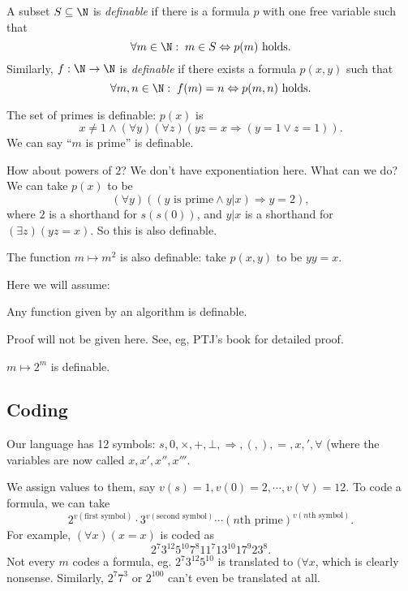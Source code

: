 \documentclass[a4paper]{article}
\begin{document}
\begin{defi}[Definability]
  A subset $S\subseteq \N$ is \emph{definable} if there is a formula $p$ with one free variable such that
  \[
    \forall m\in \N:\; m\in S \Leftrightarrow p(m)\text{ holds}.
  \]
  Similarly, $f: \N \to \N$ is \emph{definable} if there exists a formula $p(x, y)$ such that
  \[
    \forall m, n\in \N:\; f(m) = n \Leftrightarrow p(m, n)\text{ holds}.
  \]
\end{defi}

\begin{eg}
  The set of primes is definable: $p(x)$ is
  \[
    x\not = 1 \wedge (\forall y)(\forall z)(yz = x \Rightarrow (y = 1\vee z = 1)).
  \]
  We can say ``$m$ is prime'' is definable.

  How about powers of $2$? We don't have exponentiation here. What can we do? We can take $p(x)$ to be
  \[
    (\forall y)((y\text{ is prime}\wedge y | x) \Rightarrow  y = 2),
  \]
  where $2$ is a shorthand for $s(s(0))$, and $y|x$ is a shorthand for $(\exists z)(yz = x)$. So this is also definable.

  The function $m\mapsto m^2$ is also definable: take $p(x, y)$ to be $yy = x$.
\end{eg}

Here we will assume:
\begin{fact}
  Any function given by an algorithm is definable.
\end{fact}
Proof will not be given here. See, eg, PTJ's book for detailed proof.

\begin{eg}
  $m\mapsto 2^m$ is definable.
\end{eg}

\subsection*{Coding}
Our language has 12 symbols: $s, 0, \times, +, \bot, \Rightarrow, (, ), =, x, ', \forall$ (where the variables are now called $x, x', x'', x'''$.

We assign values to them, say $v(s) = 1, v(0) = 2, \cdots, v(\forall) = 12$. To code a formula, we can take
\[
  2^{v(\text{first symbol})}\cdot 3^{v(\text{second symbol})}\cdots (n\text{th prime})^{v(n\text{th symbol})}.
\]
For example, $(\forall x)(x = x)$ is coded as
\[
  2^7 3^{12}5^{10}7^8 11^7 13^{10}17^9 23^8.
\]
Not every $m$ codes a formula, eg. $2^7 3^{12}5^{10}$ is translated to $(\forall x$, which is clearly nonsense. Similarly, $2^7 7^3$ or $2^{100}$ can't even be translated at all.
\end{document}
